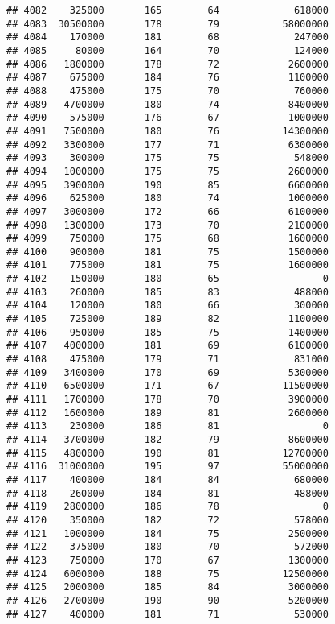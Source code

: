 \documentclass[
]{article}
\begin{document}
\begin{verbatim}
## 4082    325000       165        64             618000
## 4083  30500000       178        79           58000000
## 4084    170000       181        68             247000
## 4085     80000       164        70             124000
## 4086   1800000       178        72            2600000
## 4087    675000       184        76            1100000
## 4088    475000       175        70             760000
## 4089   4700000       180        74            8400000
## 4090    575000       176        67            1000000
## 4091   7500000       180        76           14300000
## 4092   3300000       177        71            6300000
## 4093    300000       175        75             548000
## 4094   1000000       175        75            2600000
## 4095   3900000       190        85            6600000
## 4096    625000       180        74            1000000
## 4097   3000000       172        66            6100000
## 4098   1300000       173        70            2100000
## 4099    750000       175        68            1600000
## 4100    900000       181        75            1500000
## 4101    775000       181        75            1600000
## 4102    150000       180        65                  0
## 4103    260000       185        83             488000
## 4104    120000       180        66             300000
## 4105    725000       189        82            1100000
## 4106    950000       185        75            1400000
## 4107   4000000       181        69            6100000
## 4108    475000       179        71             831000
## 4109   3400000       170        69            5300000
## 4110   6500000       171        67           11500000
## 4111   1700000       178        70            3900000
## 4112   1600000       189        81            2600000
## 4113    230000       186        81                  0
## 4114   3700000       182        79            8600000
## 4115   4800000       190        81           12700000
## 4116  31000000       195        97           55000000
## 4117    400000       184        84             680000
## 4118    260000       184        81             488000
## 4119   2800000       186        78                  0
## 4120    350000       182        72             578000
## 4121   1000000       184        75            2500000
## 4122    375000       180        70             572000
## 4123    750000       170        67            1300000
## 4124   6000000       188        75           12500000
## 4125   2000000       185        84            3000000
## 4126   2700000       190        90            5200000
## 4127    400000       181        71             530000

\end{verbatim}
\end{document}
